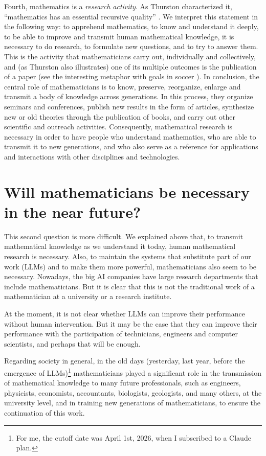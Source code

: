\documentclass[12pt]{article}
\begin{document}
Fourth, mathematics is a
\emph{research activity}.
As Thurston characterized it, ``mathematics has an essential recursive quality'' \cite{Thurston1994}.
We interpret this statement in the following way: to apprehend mathematics, to know and understand it deeply, to be able to improve and transmit human mathematical knowledge,
it is necessary to do research, to formulate new questions, and to try to answer them.
This is the activity that mathematicians carry out, individually and collectively,
and (as Thurston also illustrates) one of its multiple outcomes is the publication of a paper (see the interesting
metaphor with goals in soccer \cite{Thurston1994}).
In conclusion, the central role of mathematicians
is to know, preserve, reorganize, enlarge and transmit a body of knowledge across
generations. In this process, they organize seminars and conferences, publish new results in the form of articles,
synthesize new or old theories through the publication of books, and carry out other scientific and outreach activities.
Consequently, mathematical research is necessary in order to have people who understand mathematics,
who are able to transmit it to new generations,
and who also serve as a reference for applications and interactions with other disciplines and technologies.


\section{Will mathematicians be necessary in the near future?}


This second question is more difficult.
We explained above that, to transmit mathematical knowledge as we understand it today,
human mathematical research is necessary.
Also, to maintain the systems that
substitute part of our work (LLMs) and to make them more powerful, mathematicians also seem to be necessary.
Nowadays, the big AI companies have large research departments that include mathematicians.
But it is clear that this is not the traditional work of a mathematician at a university or a research institute.

At the moment, it is not clear whether LLMs can improve their
performance without human intervention.
But it may be the case that they can improve their performance with the
participation of technicians, engineers and computer scientists, and perhaps
that will be enough.

Regarding society in general,
in the old days (yesterday, last year, before the emergence of LLMs)\footnote{For me, the cutoff date was April 1st, 2026, when I subscribed to a Claude plan.}
mathematicians played a significant role in the transmission of mathematical knowledge to many future professionals,
such as engineers, physicists, economists, accountants, biologists, geologists, and many others, at the university level,
and in training new generations of mathematicians, to ensure the continuation of this work.
\end{document}
